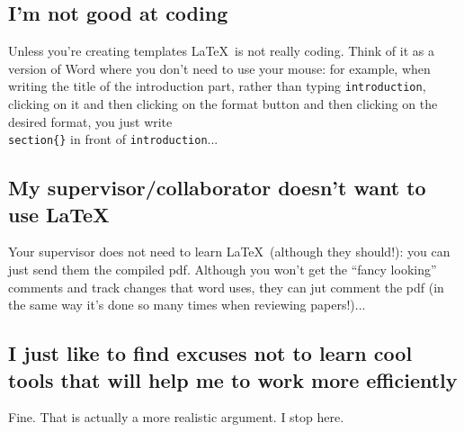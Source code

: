\documentclass[a4paper,11pt]{article}
\begin{document}
\subsection{I'm not good at coding}
Unless you're creating templates \LaTeX \ is not really coding.
Think of it as a version of Word where you don't need to use your mouse: for example, when writing the title of the introduction part, rather than typing \texttt{introduction}, clicking on it and then clicking on the format button and then clicking on the desired format, you just write \texttt{\\section\{\}} in front of \texttt{introduction}...
\subsection{My supervisor/collaborator doesn't want to use \LaTeX}
Your supervisor does not need to learn \LaTeX\ (although they should!): you can just send them the compiled pdf.
Although you won't get the ``fancy looking'' comments and track changes that word uses, they can jut comment the pdf (in the same way it's done so many times when reviewing papers!)...
\subsection{I just like to find excuses not to learn cool tools that will help me to work more efficiently}
Fine. That is actually a more realistic argument. I stop here.
\end{document}
